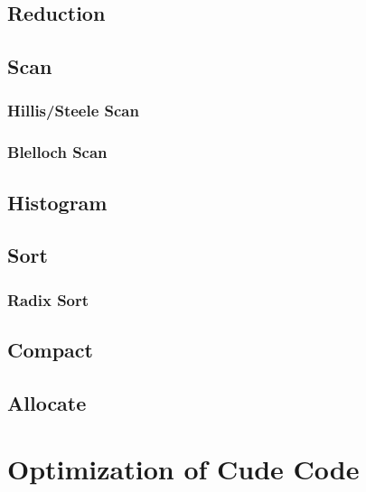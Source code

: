 \documentclass[12px,oz]{report}
\begin{document}
	\section{Reduction}
	\label{sec:al_reduction}
	
	
	\section{Scan}
	\label{sec:al_scan}
	
	
		\subsection{Hillis/Steele Scan}
		\label{sec:al_scan_hillis_steele}
		
		
		\subsection{Blelloch Scan}
		\label{sec:al_scan_blelloch}
		
	
	\section{Histogram}
	\label{sec:al_histogram}
	
	
	\section{Sort}
	\label{sec:al_sort}
	
	
		\subsection{Radix Sort}
		\label{sec:al_sort_radix}
		

	\section{Compact}
	\label{sec-compact}
	
	
	\section{Allocate}
	\label{sec-allocate}
	
	
\chapter{Optimization of Cude Code}
\label{ch-opti-intro}

\end{document}
